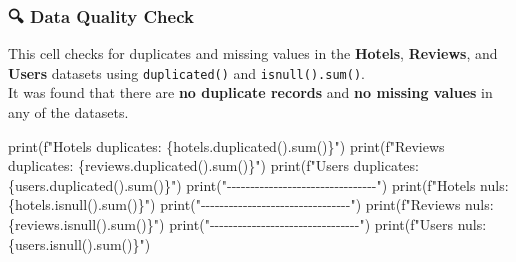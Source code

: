 \documentclass[
  letterpaper,
  DIV=11,
  numbers=noendperiod]{scrartcl}
\newenvironment{Shaded}{\begin{snugshade}}{\end{snugshade}}
\newcommand{\BuiltInTok}[1]{\textcolor[rgb]{0.00,0.23,0.31}{#1}}
\newcommand{\NormalTok}[1]{\textcolor[rgb]{0.00,0.23,0.31}{#1}}
\newcommand{\SpecialCharTok}[1]{\textcolor[rgb]{0.37,0.37,0.37}{#1}}
\newcommand{\SpecialStringTok}[1]{\textcolor[rgb]{0.13,0.47,0.30}{#1}}
\newcommand{\StringTok}[1]{\textcolor[rgb]{0.13,0.47,0.30}{#1}}
\begin{document}
\subsubsection{🔍 Data Quality Check}\label{data-quality-check}

This cell checks for duplicates and missing values in the
\textbf{Hotels}, \textbf{Reviews}, and \textbf{Users} datasets using
\texttt{duplicated()} and \texttt{isnull().sum()}.\\
It was found that there are \textbf{no duplicate records} and \textbf{no
missing values} in any of the datasets.

\begin{Shaded}
\begin{Highlighting}[]
\BuiltInTok{print}\NormalTok{(}\SpecialStringTok{f"Hotels duplicates: }\SpecialCharTok{\{}\NormalTok{hotels}\SpecialCharTok{.}\NormalTok{duplicated()}\SpecialCharTok{.}\BuiltInTok{sum}\NormalTok{()}\SpecialCharTok{\}}\SpecialStringTok{"}\NormalTok{)}
\BuiltInTok{print}\NormalTok{(}\SpecialStringTok{f"Reviews duplicates: }\SpecialCharTok{\{}\NormalTok{reviews}\SpecialCharTok{.}\NormalTok{duplicated()}\SpecialCharTok{.}\BuiltInTok{sum}\NormalTok{()}\SpecialCharTok{\}}\SpecialStringTok{"}\NormalTok{)}
\BuiltInTok{print}\NormalTok{(}\SpecialStringTok{f"Users duplicates: }\SpecialCharTok{\{}\NormalTok{users}\SpecialCharTok{.}\NormalTok{duplicated()}\SpecialCharTok{.}\BuiltInTok{sum}\NormalTok{()}\SpecialCharTok{\}}\SpecialStringTok{"}\NormalTok{)}
\BuiltInTok{print}\NormalTok{(}\StringTok{"{-}{-}{-}{-}{-}{-}{-}{-}{-}{-}{-}{-}{-}{-}{-}{-}{-}{-}{-}{-}{-}{-}{-}{-}{-}{-}{-}{-}{-}{-}{-}{-}"}\NormalTok{)}
\BuiltInTok{print}\NormalTok{(}\SpecialStringTok{f"Hotels nuls: }\SpecialCharTok{\{}\NormalTok{hotels}\SpecialCharTok{.}\NormalTok{isnull()}\SpecialCharTok{.}\BuiltInTok{sum}\NormalTok{()}\SpecialCharTok{\}}\SpecialStringTok{"}\NormalTok{)}
\BuiltInTok{print}\NormalTok{(}\StringTok{"{-}{-}{-}{-}{-}{-}{-}{-}{-}{-}{-}{-}{-}{-}{-}{-}{-}{-}{-}{-}{-}{-}{-}{-}{-}{-}{-}{-}{-}{-}{-}{-}"}\NormalTok{)}
\BuiltInTok{print}\NormalTok{(}\SpecialStringTok{f"Reviews nuls: }\SpecialCharTok{\{}\NormalTok{reviews}\SpecialCharTok{.}\NormalTok{isnull()}\SpecialCharTok{.}\BuiltInTok{sum}\NormalTok{()}\SpecialCharTok{\}}\SpecialStringTok{"}\NormalTok{)}
\BuiltInTok{print}\NormalTok{(}\StringTok{"{-}{-}{-}{-}{-}{-}{-}{-}{-}{-}{-}{-}{-}{-}{-}{-}{-}{-}{-}{-}{-}{-}{-}{-}{-}{-}{-}{-}{-}{-}{-}{-}"}\NormalTok{)}
\BuiltInTok{print}\NormalTok{(}\SpecialStringTok{f"Users nuls: }\SpecialCharTok{\{}\NormalTok{users}\SpecialCharTok{.}\NormalTok{isnull()}\SpecialCharTok{.}\BuiltInTok{sum}\NormalTok{()}\SpecialCharTok{\}}\SpecialStringTok{"}\NormalTok{)}
\end{Highlighting}
\end{Shaded}
\end{document}

